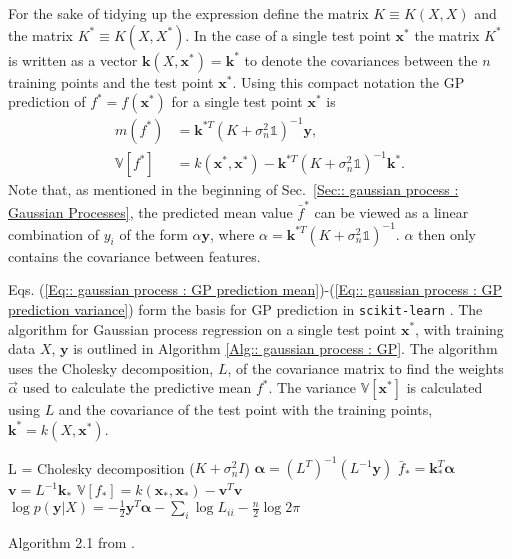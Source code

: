 \documentclass[twoside,english]{uiofysmaster}
\begin{document}
For the sake of tidying up the expression define the matrix $K \equiv K(X, X)$ and the matrix $K^* \equiv K(X, X^*)$. In the case of a single test point $\textbf{x}^*$ the matrix $K^*$ is written as a vector $\textbf{k}(X, \textbf{x}^*) = \textbf{k}^*$ to denote the covariances between the $n$ training points and the test point $\textbf{x}^*$. Using this compact notation the GP prediction of $f^*=f(\textbf{x}^*)$ for a single test point $\textbf{x}^*$ is
\begin{align}
m(f^*) &= \textbf{k}^{*T}(K + \sigma_n^2\mathbb{1})^{-1} \textbf{y},\label{Eq:: gaussian process : GP prediction mean}\\
\mathbb{V}[f^*] &= k(\textbf{x}^*, \textbf{x}^*) - \textbf{k}^{*T}(K + \sigma_n^2 \mathbb{1})^{-1} \textbf{k}^*\label{Eq:: gaussian process : GP prediction variance}.
\end{align}
Note that, as mentioned in the beginning of Sec.~\ref{Sec:: gaussian process : Gaussian Processes}, the predicted mean value $\bar{f}^*$ can be viewed as a linear combination of $y_i$ of the form $\alpha \textbf{y}$, where $\alpha = \textbf{k}^{*T}(K + \sigma_n^2\mathbb{1})^{-1}$. $\alpha$ then only contains the covariance between features.

Eqs. (\ref{Eq:: gaussian process : GP prediction mean})-(\ref{Eq:: gaussian process : GP prediction variance}) form the basis for GP prediction in \verb|scikit-learn|  \cite{scikit-learn}. The algorithm for Gaussian process regression on a single test point $\textbf{x}^*$, with training data $X$, $\textbf{y}$ is outlined in Algorithm \ref{Alg:: gaussian process : GP}. The algorithm uses the Cholesky decomposition, $L$, of the covariance matrix to find the weights $\vec{\alpha}$ used to calculate the predictive mean $f^*$. The variance $\mathbb{V}[\textbf{x}^*]$ is calculated using $L$ and the covariance of the test point with the training points, $\textbf{k}^* = k(X, \textbf{x}^*)$.

\begin{algorithm}
L = Cholesky decomposition ($K + \sigma_n^2 I$) \;
$\boldsymbol{\alpha} = (L^T)^{-1}(L^{-1} \textbf{y})$ \;
$\bar{f}_* = \textbf{k}_*^T \boldsymbol{\alpha}$ \;
$\textbf{v} = L^{-1} \textbf{k}_*$ \;
$\mathbb{V}[f_*] = k(\textbf{x}_*, \textbf{x}_*) - \textbf{v}^T \textbf{v}$ \;
$\log p(\textbf{y}|X) = - \frac{1}{2} \textbf{y}^T \boldsymbol{\alpha} - \sum_i \log L_{ii} - \frac{n}{2} \log 2 \pi$ \;
\caption{Algorithm 2.1 from \cite{rasmussen2006gaussian}.}
\label{Alg:: gaussian process : GP}
\end{algorithm}
\end{document}
